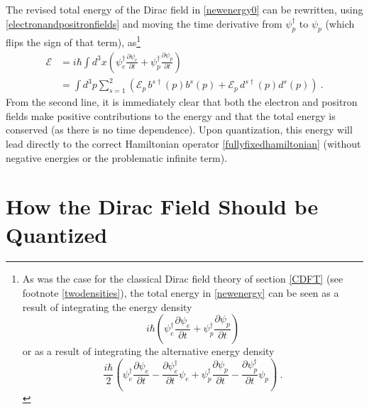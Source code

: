 \documentclass[onecolumn,secnumarabic,amsmath,amssymb,balancelastpage,nofootinbib]{article}
\begin{document}
The revised total energy of the Dirac field in \eqref{newenergy0} can be rewritten, using \eqref{electronandpositronfields} and moving the time derivative from $\psi_p^{\dagger}$ to $\psi_p$ (which flips the sign of that term), as\footnote{As was the case for the classical Dirac field theory of section \ref{CDFT} (see footnote \ref{twodensities}), the total energy in \eqref{newenergy} can be seen as a result of integrating the energy density
\begin{equation}
i \hbar \left( \psi_e^{\dagger}\frac{\partial \psi_e}{\partial t} + \psi_p^{\dagger}\frac{\partial \psi_p}{\partial t}\right)
\end{equation}
or as a result of integrating the alternative energy density
\begin{equation}
\frac{i \hbar}{2} \left( \psi_e^{\dagger}\frac{\partial \psi_e}{\partial t} -\frac{\partial\psi_e^{\dagger} }{\partial t}\psi_e+ \psi_p^{\dagger}\frac{\partial \psi_p}{\partial t}-\frac{\partial \psi_p^{\dagger}}{\partial t} \psi_p\right)
\ .
\end{equation}
\label{newdensities}
}
\begin{align}
\mathcal{E}&=i \hbar \int{d^3 x \left( \psi_e^{\dagger}\frac{\partial \psi_e}{\partial t} + \psi_p^{\dagger}\frac{\partial \psi_p}{\partial t}\right)}
\nonumber
\\
&=\int{d^3 p \sum_{s=1}^2  \left(\mathcal{E}_p\,b^{s\dagger}(p)b^{s}(p)+\mathcal{E}_p\,d^{s\dagger}(p)d^{s}(p)\right)}
\ .
\label{newenergy}
\end{align}
From the second line, it is immediately clear that both the electron and positron fields make positive contributions to the energy and that the total energy is conserved (as there is no time dependence).  Upon quantization, this energy will lead directly to the correct Hamiltonian operator \eqref{fullyfixedhamiltonian} (without negative energies or the problematic infinite term).







\section{How the Dirac Field Should be Quantized}\label{howtoquantize}
\end{document}
